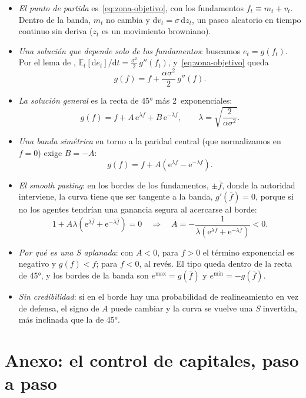 \documentclass[11pt]{article}
\begin{document}
\begin{itemize}
\item \emph{El punto de partida} es~\eqref{eq:zona-objetivo}, con los fundamentos $f_t\equiv m_t+v_t$. Dentro de la banda, $m_t$ no cambia y $\mathrm{d}v_t=\sigma\,\mathrm{d}z_t$, un paseo aleatorio en tiempo continuo sin deriva ($z_t$ es un movimiento browniano).
\item \emph{Una solución que depende solo de los fundamentos}: buscamos $e_t=g(f_t)$. Por el lema de , $\mathbb{E}_t[\mathrm{d}e_t]/\mathrm{d}t=\tfrac{\sigma^2}{2}\,g''(f_t)$, y~\eqref{eq:zona-objetivo} queda
  $$g(f)=f+\frac{\alpha\sigma^2}{2}\,g''(f).$$
\item \emph{La solución general} es la recta de 45° más 2~exponenciales:
  $$g(f)=f+A\,\mathrm{e}^{\lambda f}+B\,\mathrm{e}^{-\lambda f},\qquad \lambda=\sqrt{\frac{2}{\alpha\sigma^2}}.$$
\item \emph{Una banda simétrica} en torno a la paridad central (que normalizamos en $f=0$) exige $B=-A$:
  $$g(f)=f+A\left(\mathrm{e}^{\lambda f}-\mathrm{e}^{-\lambda f}\right).$$
\item \emph{El \emph{smooth pasting}}: en los bordes de los fundamentos, $\pm\bar f$, donde la autoridad interviene, la curva tiene que ser tangente a la banda, $g'(\bar f)=0$, porque si no los agentes tendrían una ganancia segura al acercarse al borde:
  $$1+A\lambda\left(\mathrm{e}^{\lambda\bar f}+\mathrm{e}^{-\lambda\bar f}\right)=0\quad\Rightarrow\quad A=-\frac{1}{\lambda\left(\mathrm{e}^{\lambda\bar f}+\mathrm{e}^{-\lambda\bar f}\right)}<0.$$
\item \emph{Por qué es una S aplanada}: con $A<0$, para $f>0$ el término exponencial es negativo y $g(f)<f$; para $f<0$, al revés. El tipo queda dentro de la recta de 45°, y los bordes de la banda son $e^{\max}=g(\bar f)$ y $e^{\min}=-g(\bar f)$\nocite{Krugman1991Target}. \findemo
\item \emph{Sin credibilidad}: si en el borde hay una probabilidad de realineamiento en vez de defensa, el signo de $A$ puede cambiar y la curva se vuelve una \emph{S} invertida, más inclinada que la de 45°\nocite{BertolaCaballero1992Target}.
\end{itemize}

\section{Anexo: el control de capitales, paso a paso}\label{anexo:controles}
\end{document}
